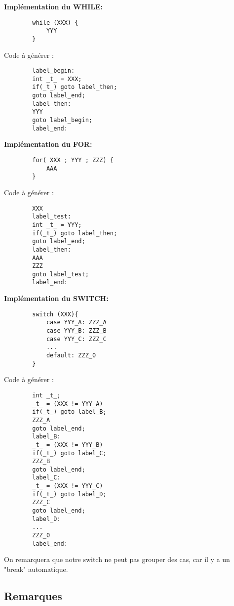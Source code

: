 \documentclass[12pt, a4paper]{article}
\begin{document}
\textbf{Implémentation du WHILE:}
\begin{codequote}
    \begin{verbatim}
        while (XXX) {
            YYY
        }
    \end{verbatim}
\end{codequote}
Code à générer :
\begin{codequote}
    \begin{verbatim}
        label_begin:
        int _t_ = XXX;
        if(_t_) goto label_then;
        goto label_end;
        label_then:
        YYY
        goto label_begin;
        label_end:
    \end{verbatim}
\end{codequote}


\textbf{Implémentation du FOR:}
\begin{codequote}
    \begin{verbatim}
        for( XXX ; YYY ; ZZZ) {
            AAA
        }
    \end{verbatim}
\end{codequote}
Code à générer :
\begin{codequote}
    \begin{verbatim}
        XXX
        label_test:
        int _t_ = YYY;
        if(_t_) goto label_then;
        goto label_end;
        label_then:
        AAA
        ZZZ
        goto label_test;
        label_end:
    \end{verbatim}
\end{codequote}


\textbf{Implémentation du SWITCH:}
\begin{codequote}
    \begin{verbatim}
        switch (XXX){
            case YYY_A: ZZZ_A
            case YYY_B: ZZZ_B
            case YYY_C: ZZZ_C
            ...
            default: ZZZ_0 
        }
    \end{verbatim}
\end{codequote}
Code à générer :
\begin{codequote}
    \begin{verbatim}
        int _t_;
        _t_ = (XXX != YYY_A)
        if(_t_) goto label_B;
        ZZZ_A
        goto label_end;
        label_B:
        _t_ = (XXX != YYY_B)
        if(_t_) goto label_C;
        ZZZ_B
        goto label_end;
        label_C:
        _t_ = (XXX != YYY_C)
        if(_t_) goto label_D;
        ZZZ_C
        goto label_end;
        label_D:
        ...
        ZZZ_0
        label_end:
    \end{verbatim}
\end{codequote}
On remarquera que notre switch ne peut pas grouper des cas, car il y a un "break" automatique.

\subsection*{Remarques}
\end{document}
